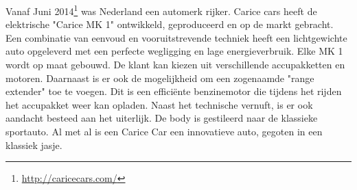 Vanaf Juni 2014\footnote{\url{http://caricecars.com/}} was Nederland een automerk rijker. Carice cars heeft de elektrische "Carice MK 1" ontwikkeld, geproduceerd en op de markt gebracht. 
Een combinatie van eenvoud en vooruitstrevende techniek heeft een lichtgewichte auto opgeleverd met een perfecte wegligging en lage energieverbruik. 
\newline
Elke MK 1 wordt op maat gebouwd. De klant kan kiezen uit verschillende accupakketten en motoren. Daarnaast is er ook de mogelijkheid om een zogenaamde "range extender" toe te voegen. Dit is een efficiënte benzinemotor die tijdens het rijden het accupakket weer kan opladen. 
Naast het technische vernuft, is er ook aandacht besteed aan het uiterlijk. De body is gestileerd naar de klassieke sportauto.
\newline
Al met al is een Carice Car een innovatieve auto, gegoten in een klassiek jasje.